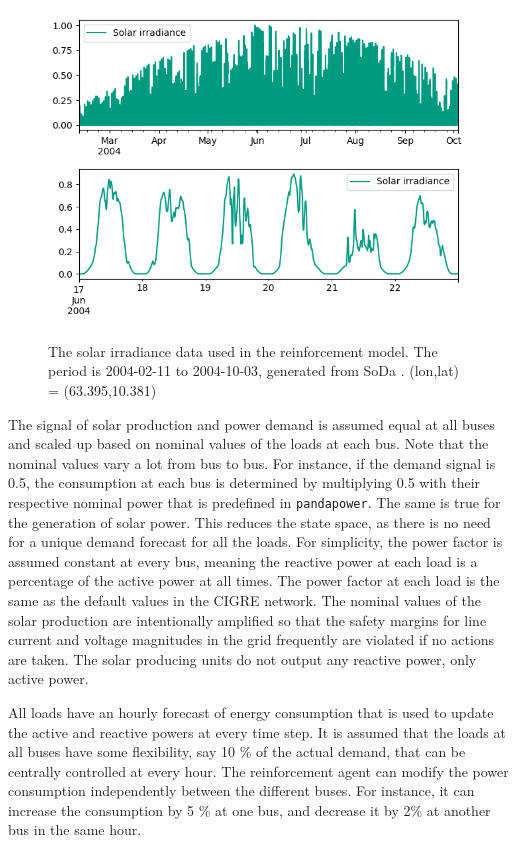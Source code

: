 \documentclass[class=book, crop=false]{standalone}
\begin{document}
\begin{figure}[ht]
    \center
    \includegraphics[height=9cm, width=13.5cm]{figures/solar_data.png}
    \caption[size = 9]{The solar irradiance data used in the reinforcement model. The period is 2004-02-11 to 2004-10-03, generated from SoDa \cite{solar_data}. (lon,lat) = (63.395,10.381) }
    \label{fig:problem:solar_data}
\end{figure}




The signal of solar production and power demand is assumed equal at all buses and scaled up based on nominal values of the loads at each bus. Note that the nominal values vary a lot from bus to bus. For instance, if the demand signal is 0.5, the consumption at each bus is determined by multiplying 0.5 with their respective nominal power that is predefined in \texttt{pandapower}. The same is true for the generation of solar power. This reduces the state space, as there is no need for a unique demand forecast for all the loads.  For simplicity, the power factor is assumed constant at every bus, meaning the reactive power at each load is a percentage of the active power at all times. The power factor at each load is the same as the default values in the CIGRE network. The nominal values of the solar production are intentionally amplified so that the safety margins for line current and voltage magnitudes in the grid frequently are violated if no actions are taken. The solar producing units do not output any reactive power, only active power. 

All loads have an hourly forecast of energy consumption that is used to update the active and reactive powers at every time step. It is assumed that the loads at all buses have some flexibility, say 10 \% of the actual demand, that can be centrally controlled at every hour. The reinforcement agent can modify the power consumption independently between the different buses. For instance, it can increase the consumption by 5 \% at one bus, and decrease it by 2\% at another bus in the same hour. 
\end{document}

